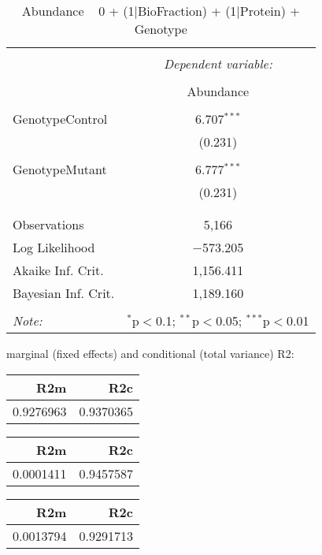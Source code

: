 \documentclass[11pt]{report}
\begin{document}
\begin{table}[!htbp] \centering 
  \caption{Abundance ~ 0 + (1|BioFraction) + (1|Protein) + Genotype} 
  \label{} 
\begin{tabular}{@{\extracolsep{5pt}}lc} 
\\[-1.8ex]\hline 
\hline \\[-1.8ex] 
 & \multicolumn{1}{c}{\textit{Dependent variable:}} \\ 
\cline{2-2} 
\\[-1.8ex] & Abundance \\ 
\hline \\[-1.8ex] 
 GenotypeControl & 6.707$^{***}$ \\ 
  & (0.231) \\ 
  & \\ 
 GenotypeMutant & 6.777$^{***}$ \\ 
  & (0.231) \\ 
  & \\ 
\hline \\[-1.8ex] 
Observations & 5,166 \\ 
Log Likelihood & $-$573.205 \\ 
Akaike Inf. Crit. & 1,156.411 \\ 
Bayesian Inf. Crit. & 1,189.160 \\ 
\hline 
\hline \\[-1.8ex] 
\textit{Note:}  & \multicolumn{1}{r}{$^{*}$p$<$0.1; $^{**}$p$<$0.05; $^{***}$p$<$0.01} \\ 
\end{tabular} 
\end{table} 
marginal (fixed effects) and conditional (total variance) R2:

\begin{tabular}{r|r}
\hline
R2m & R2c\\
\hline
0.9276963 & 0.9370365\\
\hline
\end{tabular}

\begin{tabular}{r|r}
\hline
R2m & R2c\\
\hline
0.0001411 & 0.9457587\\
\hline
\end{tabular}

\begin{tabular}{r|r}
\hline
R2m & R2c\\
\hline
0.0013794 & 0.9291713\\
\hline
\end{tabular}
\end{document}
